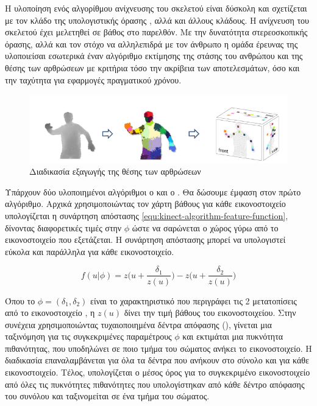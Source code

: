 Η υλοποίηση ενός αλγορίθμου ανίχνευσης του σκελετού είναι δύσκολη και σχετίζεται με τον κλάδο της υπολογιστικής όρασης \cite{mubarak97}, αλλά και άλλους κλάδους. Η ανίχνευση του σκελετού έχει μελετηθεί σε βάθος \cite{moseslund01, poppe07} στο παρελθόν. Με την δυνατότητα στερεοσκοπικής όρασης, αλλά και τον στόχο να αλληλεπιδρά με τον άνθρωπο η ομάδα έρευνας της  υλοποιείσαι εσωτερικά έναν αλγόριθμο εκτίμησης της στάσης του ανθρώπου και της θέσης των αρθρώσεων \cite{shotton11} με κριτήρια τόσο την ακρίβεια των αποτελεσμάτων, όσο και την ταχύτητα για εφαρμογές πραγματικού χρόνου.

\begin{figure}[H]
    \centering
    \includegraphics[width=.9\textwidth, keepaspectratio]{fig/kinect-skeleton-algorithm.png}
    \caption{Διαδικασία εξαγωγής της θέσης των αρθρώσεων \cite{shotton11}}
    \label{fig:kinect-skeleton-algorithm}
\end{figure}

Υπάρχουν δύο υλοποιημένοι αλγόριθμοι ο  και ο . Θα δώσουμε έμφαση στον πρώτο αλγόριθμο. Αρχικά χρησιμοποιώντας τον χάρτη βάθους για κάθε εικονοστοιχείο υπολογίζεται η συνάρτηση απόστασης \ref{equ:kinect-algorithm-feature-function}, δίνοντας διαφορετικές τιμές στην $\phi$ ώστε να σαρώνεται ο χώρος γύρω από το εικονοστοιχείο που εξετάζεται. Η συνάρτηση απόστασης μπορεί να υπολογιστεί εύκολα και παράλληλα για κάθε εικονοστοιχείο.

\begin{equation}
    f(u|\phi ) = z\big( u + \frac{\delta_1}{z(u)}\big)-z\big( u + \frac{\delta_2}{z(u)}\big)
    \label{equ:kinect-algorithm-feature-function}
\end{equation}

Όπου το $\phi = (\delta_1, \delta_2)$ είναι το χαρακτηριστικό που περιγράφει τις 2 μετατοπίσεις από το εικονοστοιχείο , η $z(u)$ δίνει την τιμή βάθους του εικονοστοιχείου. Στην συνέχεια χρησιμοποιώντας τυχαιοποιημένα δέντρα απόφασης (), γίνεται μια ταξινόμηση για τις συγκεκριμένες παραμέτρους $\phi$ και εκτιμάται μια πυκνότητα πιθανότητας, που υποδηλώνει σε ποιο τμήμα του σώματος ανήκει το εικονοστοιχείο. Η διαδικασία επαναλαμβάνεται για όλα τα δέντρα που ανήκουν στο σύνολο και για κάθε εικονοστοιχείο. Τέλος, υπολογίζεται ο μέσος όρος για το συγκεκριμένο εικονοστοιχείο από όλες τις πυκνότητες πιθανότητες που υπολογίστηκαν από κάθε δέντρο απόφασης του συνόλου και ταξινομείται σε ένα τμήμα του σώματος.


